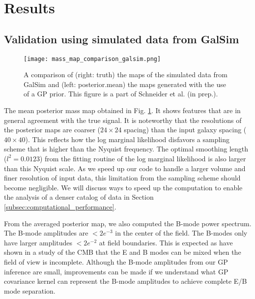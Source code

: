 \section{Results}

\subsection{Validation using simulated data from {\sc GalSim}}
\begin{figure}[!ht]
	\centering
	\texttt{[image: mass\_map\_comparison\_galsim.png]}
	\caption{A comparison of (right: truth) the maps of the simulated data from {\sc GalSim}  and
	(left: posterior.mean) the maps generated with the use of a GP prior. 
	This figure is a part of Schneider et al. (in prep.). \label{fig:Galsim_massmap}
}
\end{figure}
The mean posterior mass map obtained in Fig. \ref{fig:Galsim_massmap}. 
It shows features that are in general agreement with the true signal. 
It is noteworthy that the resolutions of the posterior maps are coarser ($24 \times 24$
spacing) than the input galaxy
spacing ($40 \times 40$). This reflects how the log marginal likelihood disfavors a sampling
scheme that is higher than the Nyquist frequency. The optimal smoothing length
($l^2 = 0.0123$) from the fitting routine of the log marginal likelihood is also
larger than this Nyquist scale. As we speed up our code to handle a larger
volume and finer
resolution of input data, this limitation from the sampling scheme should
become negligible. We will discuss ways to speed up the computation to enable
the analysis of a denser catalog of data in Section
\ref{subsec:computational_performance}. 

From the averaged posterior map, we also computed the B-mode power spectrum.
The B-mode amplitudes are $< 2e^{-3}$ in the center of the field. 
The B-modes only have larger amplitudes $< 2e^{-2}$ at field boundaries.  
This is expected as \cite{Bunn2003} have shown in a study of the CMB that 
the E and B modes can be mixed when the field of view is incomplete.
Although the B-mode amplitudes from our GP inference are small, 
improvements can be made 
if we understand what GP covariance kernel can represent the B-mode amplitudes to achieve complete E/B mode
separation.

